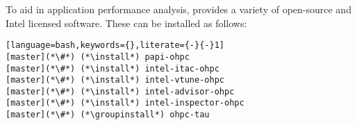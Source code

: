 To aid in application performance analysis, \OHPC{} provides a variety of
open-source and Intel licensed software. These can be installed as follows:

\begin{lstlisting}[language=bash,keywords={},literate={-}{-}1]
[master](*\#*) (*\install*) papi-ohpc
[master](*\#*) (*\install*) intel-itac-ohpc
[master](*\#*) (*\install*) intel-vtune-ohpc
[master](*\#*) (*\install*) intel-advisor-ohpc
[master](*\#*) (*\install*) intel-inspector-ohpc
[master](*\#*) (*\groupinstall*) ohpc-tau
\end{lstlisting}
